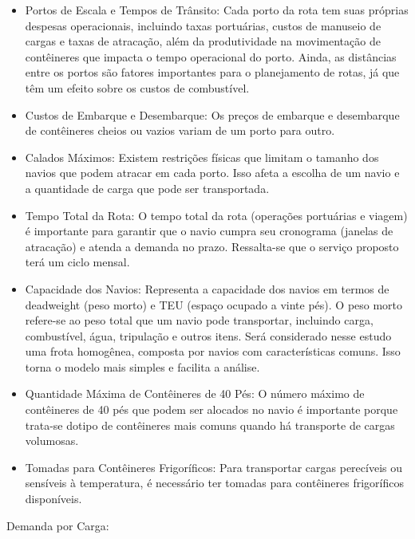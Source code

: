\documentclass[preprint,10pt,5p]{elsarticle}
\begin{document}
\begin{itemize}

     \item Portos de Escala e Tempos de Trânsito: Cada porto da rota tem suas próprias despesas operacionais, incluindo taxas portuárias, custos de manuseio de cargas e taxas de atracação, além da produtividade na movimentação de contêineres que impacta o tempo operacional do porto. Ainda, as distâncias entre os portos são fatores importantes para o planejamento de rotas, já que têm um efeito sobre os custos de combustível.
    \item Custos de Embarque e Desembarque: Os preços de embarque e desembarque de contêineres cheios ou vazios variam de um porto para outro.
    \item Calados Máximos: Existem restrições físicas que limitam o tamanho dos navios que podem atracar em cada porto. Isso afeta a escolha de um navio e a quantidade de carga que pode ser transportada.
    \item Tempo Total da Rota: O tempo total da rota (operações portuárias e viagem) é importante para garantir que o navio cumpra seu cronograma (janelas de atracação) e atenda a demanda no prazo. Ressalta-se que o serviço proposto terá um ciclo mensal.
    \item Capacidade dos Navios: Representa a capacidade dos navios em termos de deadweight (peso morto) e TEU (espaço ocupado a vinte pés). O peso morto refere-se ao peso total que um navio pode transportar, incluindo carga, combustível, água, tripulação e outros itens. Será considerado nesse estudo uma frota homogênea, composta por navios com características comuns. Isso torna o modelo mais simples e facilita a análise.
    \item Quantidade Máxima de Contêineres de 40 Pés: O número máximo de contêineres de 40 pés que podem ser alocados no navio é importante porque trata-se dotipo de contêineres mais comuns quando  há transporte de cargas volumosas.
    \item Tomadas para Contêineres Frigoríficos: Para transportar cargas perecíveis ou sensíveis à temperatura, é necessário ter tomadas para contêineres frigoríficos disponíveis.
\end{itemize}

Demanda por Carga:
\end{document}
